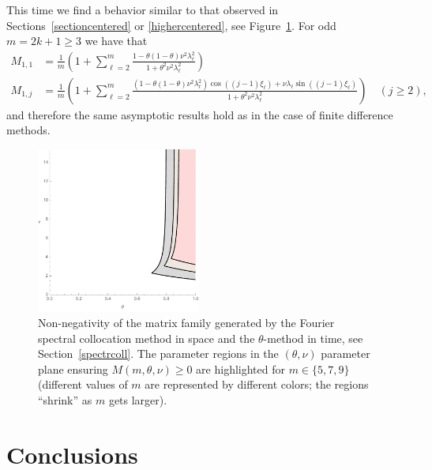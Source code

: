 \documentclass[a4paper]{article}
\newcommand{\te}{\theta}
\begin{document}
\begin{description}[style=unboxed,leftmargin=0cm]
\item [{Case 2:} $m$ is {odd}.]
This time we find a behavior similar to that observed in Sections~\ref{sectioncentered} or
\ref{highercentered}, see Figure~\ref{fig_spectral}.
For odd $m = 2k+1 \ge 3$ we have that
\begin{align*}
	M_{1,1} & = \frac{1}{m} \left(1 + \sum_{\ell=2}^{m} \frac{1-\theta(1-\theta)\nu^2\lambda^2_\ell}
		{1+\theta^2\nu^2\lambda^2_\ell}\right) \\
	M_{1,j} & = \frac{1}{m} \left(1 + \sum_{\ell=2}^{m} \frac{(1-\theta(1-\theta)\nu^2\lambda^2_\ell)
		\cos((j-1)\xi_\ell) + \nu \lambda_\ell\sin((j-1)\xi_\ell)}{1+\theta^2\nu^2\lambda^2_\ell}
		\right) \quad (j\ge 2),
\end{align*}
and therefore the same asymptotic results hold as in the case of finite difference methods.
\end{description}

\begin{figure}
\begin{center}
\includegraphics[width=0.48\textwidth]{fig_spectral.pdf}
\caption{Non-negativity of the matrix family generated by the Fourier spectral collocation method in space and the $\theta$-method in time, see Section~\ref{spectrcoll}. The parameter regions in the $(\te,\nu)$ parameter plane ensuring $M(m,\te,\nu)\ge 0$ are highlighted for $m\in\{5, 7, 9\}$ (different values of $m$ are represented by different colors; the regions ``shrink'' as $m$ gets larger).}\label{fig_spectral}
\end{center}
\end{figure}


\section{Conclusions}\label{conclusions}
\end{document}
